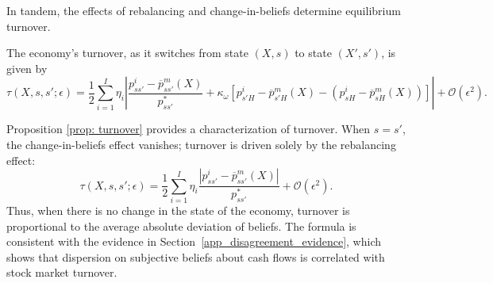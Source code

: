 In tandem, the effects of rebalancing and change-in-beliefs determine equilibrium turnover. 
\begin{proposition}[Turnover]
The economy's turnover, as it switches from state $(X,s)$ to state $(X',s')$, is given by\small
\begin{equation}\label{eq: turnover}
    \tau(X,s,s';\epsilon) = \frac{1}{2} \sum_{i=1}^I \eta_i\left\lvert  \frac{p_{ss'}^i - \overline{p}_{ss'}^m(X)}{p_{ss'}^*} +\kappa_\omega\left[p_{s'H}^i - \overline{p}_{s'H}^m(X) - (p_{sH}^i - \overline{p}^m_{sH}(X)) \right] \right\rvert  + \mathcal{O}(\epsilon^2).
\end{equation}\normalsize
\end{proposition}

Proposition \ref{prop: turnover} provides a characterization of turnover. When $s = s'$, the change-in-beliefs effect vanishes; turnover is driven solely by the rebalancing effect:
\begin{equation}
    \tau(X,s,s';\epsilon) = \frac{1}{2} \sum_{i=1}^I \eta_i \frac{|p_{ss'}^i - \overline{p}_{ss'}^m(X)|}{p_{ss'}^*} + \mathcal{O}(\epsilon^2).\nonumber
\end{equation}
Thus, when there is no change in the state of the economy,  turnover is proportional to the average absolute deviation of beliefs. The formula is consistent with the evidence in Section~\ref{app_disagreement_evidence}, which shows that dispersion on subjective beliefs about cash flows is correlated with stock market turnover.  

